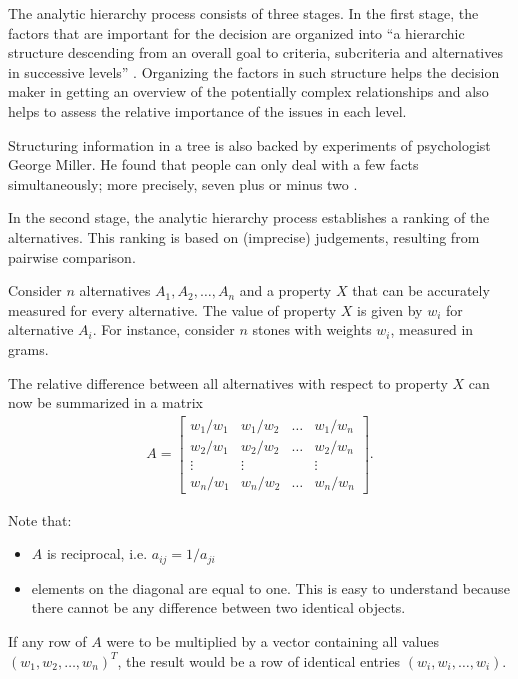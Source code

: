 The analytic hierarchy process consists of three stages. In the first stage, the factors that are important for the decision are organized into ``a hierarchic structure descending from an overall goal to criteria, subcriteria and alternatives in successive levels'' \cite{Saaty:1990}. Organizing the factors in such structure helps the decision maker in getting an overview of the potentially complex relationships and also helps to assess the relative importance of the issues in each level. 

Structuring information in a tree is also backed by experiments of psychologist George Miller. He found that people can only deal with a few facts simultaneously; more precisely, seven plus or minus two \cite{Miller:1956}. 

In the second stage, the analytic hierarchy process establishes a ranking of the alternatives. This ranking is based on (imprecise) judgements, resulting from pairwise comparison. 

Consider $n$ alternatives $A_1, A_2, \ldots, A_n$ and a property $X$ that can be accurately measured for every alternative. The value of property $X$ is given by $w_i$ for alternative $A_i$. For instance, consider $n$ stones with weights $w_i$, measured in grams.

The relative difference between all alternatives with respect to property $X$ can now be summarized in a matrix
\begin{gather}
    A = %
    \begin{bmatrix}
        w_1/w_1 & w_1/w_2 & \ldots & w_1/w_n \\
        w_2/w_1 & w_2/w_2 & \ldots & w_2/w_n \\
        \vdots  & \vdots  &        & \vdots  \\
        w_n/w_1 & w_n/w_2 & \ldots & w_n/w_n    
    \end{bmatrix}.
\end{gather}

Note that:
\begin{itemize}
    \item $A$ is reciprocal, i.e. $a_{ij} = 1 / a_{ji}$
    \item elements on the diagonal are equal to one. This is easy to understand because there cannot be any difference between two identical objects.
\end{itemize}

If any row of $A$ were to be multiplied by a vector containing all values $(w_1, w_2, \ldots, w_n)^T$, the result would be a row of identical entries $(w_i, w_i, \ldots, w_i)$. 

